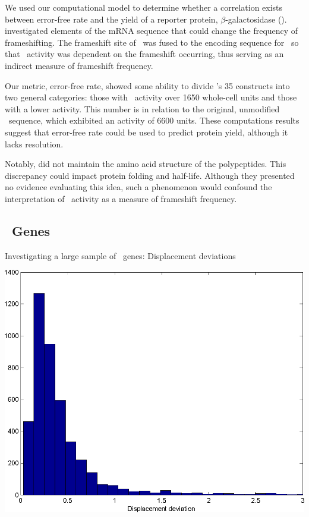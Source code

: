 \documentclass[twocolumn]{article}
\begin{document}
We used our computational model to determine whether a correlation exists between 
error-free rate and the yield of a reporter protein, $\beta$-galactosidase (\bgals).  
\citet{weiss87} investigated elements of the mRNA sequence that could change the frequency 
of frameshifting.  The frameshift site of \prfB\ was fused to the encoding sequence for 
\bgals\ so that \bgals\ activity was dependent on the frameshift occurring, 
thus serving as an indirect measure of frameshift frequency.  

Our metric, error-free rate, showed some ability to divide \citeauthor{weiss87}'s 35 constructs into 
two general categories: those with \bgals\ activity over 1650 whole-cell units and those with a 
lower activity.  This number is in relation to the original, unmodified \prfB\ sequence, 
which exhibited an activity of 6600 units.  These computations results suggest that 
error-free rate could be used to predict protein yield, although it lacks resolution.

Notably, \citeauthor{weiss87} did not maintain the amino acid structure of the polypeptides.  
This discrepancy could impact protein folding and half-life.  Although they
presented no evidence evaluating this idea, such a phenomenon would confound the interpretation 
of \bgals\ activity as a measure of frameshift frequency.

\subsection{\ecoli\ Genes}
\begin{cfigure}
  \caption{Investigating a large sample of \ecoli\ genes: Displacement deviations}
  \label{ecoli:hist}
  \includegraphics[width=\linewidth]{histograms/everything}
\end{cfigure}
\end{document}
